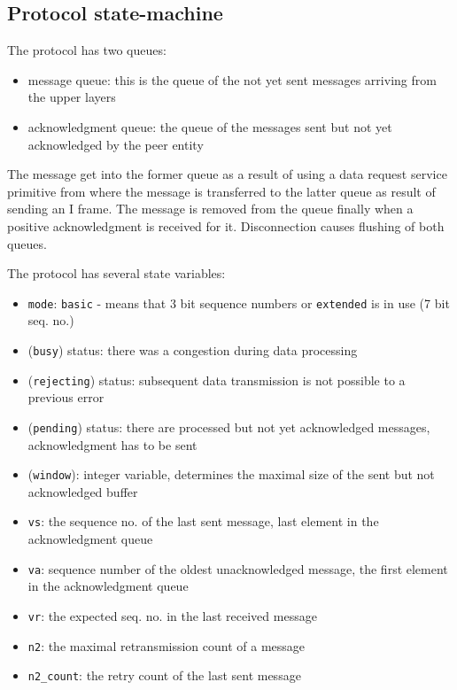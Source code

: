 \documentclass[a4paper]{article}
\begin{document}
\subsection{Protocol state-machine}

The protocol has two queues:
\begin{itemize}
\item message queue: this is the queue of the not yet sent messages arriving from the upper layers
\item acknowledgment queue: the queue of the messages sent but not yet acknowledged by the peer entity
\end{itemize}

The message get into the former queue as a result of using a data request service primitive from where the message is transferred to the latter queue as result of sending an I frame. The message is removed from the queue finally when a positive acknowledgment is received for it. Disconnection causes flushing of both queues.

The protocol has several state variables: 
\begin{itemize}
\item \verb!mode!: \verb!basic! - means that 3 bit sequence numbers or
   \verb!extended! is in use (7 bit seq. no.)
\item (\verb!busy!) status: there was a congestion during data processing
\item (\verb!rejecting!) status: subsequent data transmission is not possible to a previous error
\item (\verb!pending!) status: there are processed but not yet acknowledged messages, acknowledgment has to be sent
\item (\verb!window!): integer variable, determines the maximal size of the sent but not acknowledged buffer
\item \verb!vs!: the sequence no. of the last sent message, last element in the acknowledgment queue
\item \verb!va!: sequence number of the oldest unacknowledged message, the first element in the acknowledgment queue
\item \verb!vr!: the expected seq. no. in the last received message
\item \verb!n2!: the maximal retransmission count of a message
\item \verb!n2_count!: the retry count of the last sent message
\end{itemize}
\end{document}
